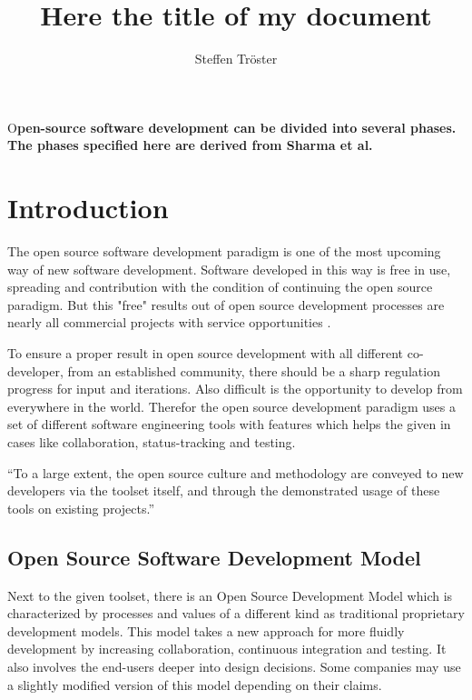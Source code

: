 \documentclass[DIV=calc,paper=a4,fontsize=11pt,twocolumn]{scrartcl}
\title{Here the title of my document}					%
\author{Steffen Tröster \\}											%
\date{}																%
\newcommand{\initial}[1]{%
     \lettrine[lines=3,lhang=0.3,nindent=0em]{
                    \color{DarkGoldenrod}
                    {\textsf{#1}}}{}}
\begin{document}
\maketitle
\thispagestyle{fancy}		%
\initial{O}\textbf{pen-source software development can be divided into several phases. The phases specified here are derived from Sharma et al. \citep{ZitovaF03}}

\section{Introduction}

The open source software development paradigm is one of the most upcoming way of new software development. Software developed in this way is free in use, spreading and contribution with the condition of continuing the open source paradigm. But this "free" results out of open source development processes are nearly all commercial projects with service opportunities \citep{Wheeler}.

To ensure a proper result in open source development with all different co-developer, from an established community, there should be a sharp regulation progress for input and iterations. Also difficult is the opportunity to develop from everywhere in the world. Therefor the open source development paradigm uses a set of different software engineering tools with features which helps the given in cases like collaboration, status-tracking and testing.

\enquote{To a large extent, the open source culture and methodology are conveyed to new developers via the toolset itself, and through the demonstrated usage of these tools on existing projects.} \citep{Robbins02adoptingoss}

\subsection{Open Source Software Development Model}

Next to the given toolset, there is an Open Source Development Model which is characterized by processes and values of a different kind as traditional proprietary development models. This model takes a new approach for more fluidly development by increasing collaboration, continuous integration and testing. It also involves the end-users deeper into design decisions. Some companies may use a slightly modified version of this model depending on their claims. \citep{Haddad11}
\end{document}
